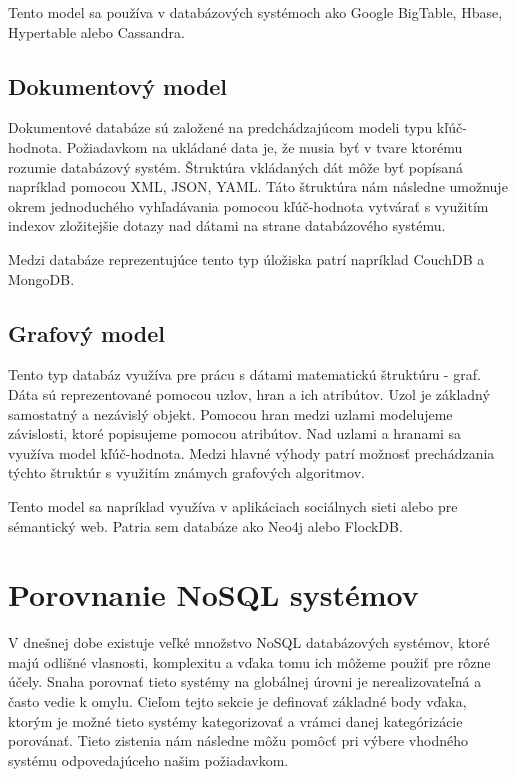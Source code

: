 \documentclass[11pt,twoside,a4paper]{book}
\begin{document}
Tento model sa používa v databázových systémoch ako Google BigTable, Hbase, Hypertable alebo Cassandra.

\subsection{Dokumentový model}

Dokumentové databáze sú založené na predchádzajúcom modeli typu kľúč-hodnota. Požiadavkom na ukládané data je, že musia byť v tvare ktorému rozumie databázový systém. Štruktúra vkládaných dát môže byť popísaná napríklad pomocou XML, JSON, YAML. Táto štruktúra nám následne umožnuje okrem jednoduchého vyhľadávania pomocou kľúč-hodnota vytvárať s využitím indexov zložitejšie dotazy nad dátami na strane databázového systému. 

Medzi databáze reprezentujúce tento typ úložiska patrí napríklad CouchDB a MongoDB.

\subsection{Grafový model}
Tento typ databáz využíva pre prácu s dátami matematickú štruktúru - graf. Dáta sú reprezentované pomocou uzlov, hran a ich atribútov. Uzol je základný samostatný a nezávislý objekt. Pomocou hran medzi uzlami modelujeme závislosti, ktoré popisujeme pomocou atribútov. Nad uzlami a hranami sa využíva model kľúč-hodnota. Medzi hlavné výhody patrí možnosť prechádzania týchto štruktúr s využitím známych grafových algoritmov. 

Tento model sa napríklad využíva v aplikáciach sociálnych sieti alebo pre sémantický web. Patria sem databáze ako Neo4j alebo FlockDB.


\section{Porovnanie NoSQL systémov}

V dnešnej dobe existuje veľké množstvo NoSQL databázových systémov, ktoré majú odlišné vlasnosti, komplexitu a vďaka tomu ich môžeme použiť pre rôzne účely. Snaha porovnať tieto systémy na globálnej úrovni je nerealizovateľná a často vedie k omylu. Cieľom tejto sekcie je definovať základné body vďaka, ktorým je možné tieto systémy kategorizovať a vrámci danej kategórizácie porovánať. Tieto zistenia nám následne môžu pomôcť pri výbere vhodného systému odpovedajúceho našim požiadavkom.
\end{document}
